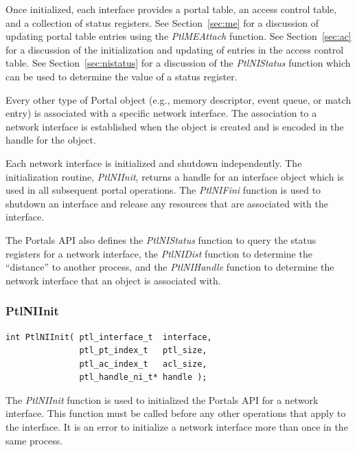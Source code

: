 \documentclass{sand-report}
\begin{document}
Once initialized, each interface provides a portal table, an access
control table, and a collection of status registers.  See
Section~\ref{sec:me} for a discussion of updating portal table entries
using the \emph{PtlMEAttach} function.  See Section~\ref{sec:ac} for a
discussion of the initialization and updating of entries in the access
control table.  See Section~\ref{sec:nistatus} for a discussion of the 
\emph{PtlNIStatus} function which can be used to determine the value
of a status register.

Every other type of Portal object (e.g., memory descriptor, event
queue, or match entry) is associated with a specific network
interface.  The association to a network interface is established when
the object is created and is encoded in the handle for the object.

Each network interface is initialized and shutdown independently.  The
initialization routine, \emph{PtlNIInit}, returns a handle for an
interface object which is used in all subsequent portal operations.
The \emph{PtlNIFini} function is used to shutdown an interface and
release any resources that are associated with the interface.

The Portals API also defines the \emph{PtlNIStatus} function to query
the status registers for a network interface, the \emph{PtlNIDist}
function to determine the ``distance'' to another process, and the
\emph{PtlNIHandle} function to determine the network interface that an
object is associated with.

\subsubsection{PtlNIInit}\label{sec:niinit}
\begin{verbatim}
int PtlNIInit( ptl_interface_t  interface,
               ptl_pt_index_t   ptl_size,
               ptl_ac_index_t   acl_size,
               ptl_handle_ni_t* handle );
\end{verbatim}

\noindent 
The \emph{PtlNIInit} function is used to initialized the Portals API
for a network interface.  This function must be called before any
other operations that apply to the interface.  It is an error to
initialize a network interface more than once in the same process.
\end{document}
